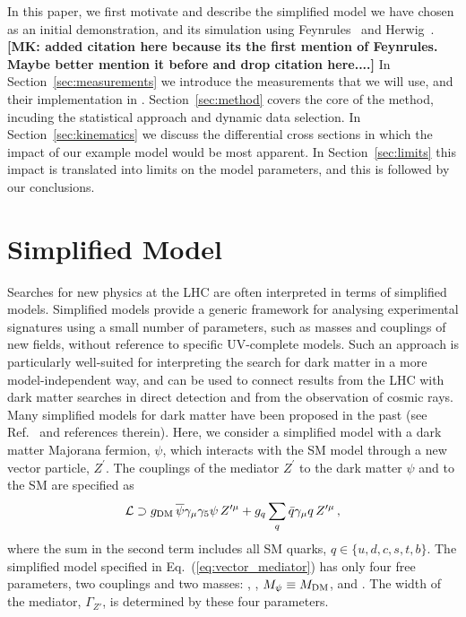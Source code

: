 \documentclass[floatfix]{article}
\begin{document}
In this paper, we first motivate and describe the 
simplified model we have chosen as an initial demonstration, and its simulation using Feynrules~\cite{Alloul:2013bka} and Herwig~\cite{}. \textbf{[MK: added citation here because its the first mention of Feynrules. Maybe  better mention it before and drop citation here....]}
In Section~\ref{sec:measurements} we introduce the measurements that we will use, and their implementation in \rivet. 
Section~\ref{sec:method} covers the core of the \Contur method, incuding the statistical approach and dynamic data selection.
In Section~\ref{sec:kinematics} we discuss the differential cross sections in which the impact of our example model would be 
most apparent. In Section~\ref{sec:limits} this impact is translated into limits on the model parameters, and this is followed by our conclusions.


\section{Simplified Model}\label{sec:model}
Searches for new physics at the LHC are often interpreted in terms of simplified models. Simplified models provide a generic 
framework for analysing experimental signatures using a small number of parameters, such as masses and 
couplings of new fields, without reference to specific UV-complete models. Such an  approach is particularly 
well-suited for interpreting the search for dark matter in a more model-independent way, and can be used to connect results from the LHC with 
dark matter searches in direct detection and from the observation of cosmic rays. Many simplified models for dark matter have been proposed 
in the past (see Ref.~\cite{Abercrombie:2015wmb} and references therein). Here, we consider a simplified model with a dark matter Majorana 
fermion, $\psi$, which interacts with the SM model through a new vector particle, $Z^\prime$. The couplings of the mediator $Z^\prime$ to 
the dark matter $\psi$ and to the 
SM are specified as %
\begin{align}\label{eq:vector_mediator}
 {\cal L} \supset  g_{\rm DM}\,\overline{\psi} \gamma_{\mu}\gamma_5 \psi\,Z'^{\mu} + g_{q}\sum_{q} \bar q \gamma_{\mu} q \,Z'^{\mu} \,,
\end{align}
%
where the sum in the second term includes all SM quarks, $q \in \{u,d,c,s,t,b\}$. The simplified model specified in Eq.~(\ref{eq:vector_mediator}) 
has only four free parameters, two couplings and two masses: \GDM, \GQ, $M_\psi \equiv M_{\rm DM}$, and \MZP. The width of the mediator, 
$\Gamma_{Z'}$, is determined by these four parameters. 
\end{document}

